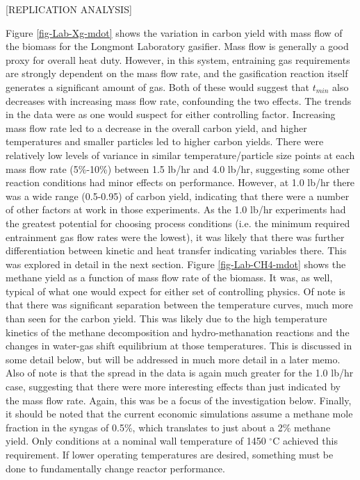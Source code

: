 \documentclass[11pt,twocolumn]{article}
\begin{document}
[REPLICATION ANALYSIS]

Figure \ref{fig-Lab-Xg-mdot} shows the variation in carbon yield with mass flow of the biomass for the Longmont Laboratory gasifier.  Mass flow is generally a good proxy for overall heat duty.  However, in this system, entraining gas requirements are strongly dependent on the mass flow rate, and the gasification reaction itself generates a significant amount of gas.  Both of these would suggest that $t_{min}$ also decreases with increasing mass flow rate, confounding the two effects.  The trends in the data were as one would suspect for either controlling factor.  Increasing mass flow rate led to a decrease in the overall carbon yield, and higher temperatures and smaller particles led to higher carbon yields.  There were relatively low levels of variance in similar temperature/particle size points at each mass flow rate (5\%-10\%) between 1.5 lb/hr and 4.0 lb/hr, suggesting some other reaction conditions had minor effects on performance.  However, at 1.0 lb/hr there was a wide range (0.5-0.95) of carbon yield, indicating that there were a number of other factors at work in those experiments.  As the 1.0 lb/hr experiments had the greatest potential for choosing process conditions (i.e. the minimum required entrainment gas flow rates were the lowest), it was likely that there was further differentiation between kinetic and heat transfer indicating variables there.  This was explored in detail in the next section.  Figure \ref{fig-Lab-CH4-mdot} shows the methane yield as a function of mass flow rate of the biomass.  It was, as well, typical of what one would expect for either set of controlling physics.  Of note is that there was significant separation between the temperature curves, much more than seen for the carbon yield.  This was likely due to the high temperature kinetics of the methane decomposition and hydro-methanation reactions and the changes in water-gas shift equilibrium at those temperatures.  This is discussed in some detail below, but will be addressed in much more detail in a later memo.  Also of note is that the spread in the data is again much greater for the 1.0 lb/hr case, suggesting that there were more interesting effects than just indicated by the mass flow rate.  Again, this was be a focus of the investigation below.  Finally, it should be noted that the current economic simulations assume a methane mole fraction in the syngas of 0.5\%, which translates to just about a 2\% methane yield.  Only conditions at a nominal wall temperature of 1450 $^{\circ}$C achieved this requirement.  If lower operating temperatures are desired, something must be done to fundamentally change reactor performance.
\end{document}
